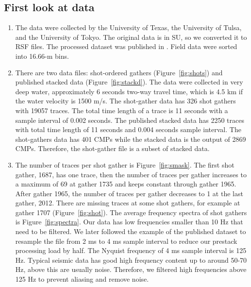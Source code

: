 \subsection{First look at data}

\begin{enumerate}

\item The data were collected by the University of Texas, the University of Tulsa, and the University of Tokyo. The original data is in SU, so we converted it to RSF files. The processed dataset was published in \cite{Moore}. Field data were sorted into 16.66-m bins.   

\item There are two data files: shot-ordered gathers (Figure~\ref{fig:shots}) and published stacked data (Figure~\ref{fig:stackd}). The data were collected in very deep water, approximately 6 seconds two-way travel time, which is 4.5 km if the water velocity is 1500 m/s. The shot-gather data has 326 shot gathers with 19057 traces. The total time length of a trace is 11 seconds with a sample interval of 0.002 seconds. The published stacked data has 2250 traces with total time length of 11 seconds and 0.004 seconds sample interval. The shot-gathers data has 401 CMPs while the stacked data is the output of 2869 CMPs. Therefore, the shot-gather file is a subset of stacked data.  

\item The number of traces per shot gather is Figure~\ref{fig:smask}. The first shot gather, 1687, has one trace, then the number of traces per gather increases to a maximum of 69 at gather 1735 and keeps constant through gather 1965. After gather 1965, the number of traces per gather decreases to 1 at the last gather, 2012. There are missing traces at some shot gathers, for example at gather 1707 (Figure~\ref{fig:shot}). The average frequency spectra of shot gathers is Figure~\ref{fig:spectra}. Our data has low frequencies smaller than 10 Hz that need to be filtered. We later followed the example of the published dataset \cite[]{Moore} to resample the file from 2 ms to 4 ms sample interval to reduce our prestack processing load by half. The Nyquist frequency of 4 ms sample interval is 125 Hz. Typical seismic data has good high frequency content up to around 50-70 Hz, above this are usually noise. Therefore, we filtered high frequencies above 125 Hz to prevent aliasing and remove noise.    


\end{enumerate}\clearpage

